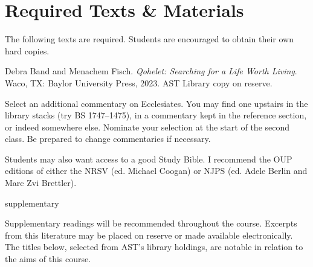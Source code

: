 \documentclass[titlepage]{article}
\newcommand\incl{../includes}
\begin{document}


%

\section{Required Texts \& Materials}
\label{texts}

The following texts are required. Students are encouraged to obtain their own hard copies.

\begingroup
\renewcommand{\section}[2]{}%
\begin{thebibliography}{BS 1747–75}%

	 Debra Band and Menachem Fisch.
    \emph{Qohelet: Searching for a Life Worth Living}.
    Waco, TX: Baylor University Press, 2023. AST Library copy on reserve.

	 Select an additional commentary on Ecclesiates.
	You may find one upstairs in the library stacks (try BS 1747–1475),
	in a commentary kept in the reference section, or indeed somewhere
	else. Nominate your selection at the start of the second class. Be
	prepared to change commentaries if necessary.

\end{thebibliography}
\endgroup

Students may also want access to a good Study Bible. I recommend the OUP
editions of either the NRSV (ed. Michael Coogan) or NJPS (ed. Adele
Berlin and Marc Zvi Brettler).

\section{Supplementary Texts}
\label{supplementary}

Supplementary readings will be recommended throughout the course.
Excerpts from this literature may be placed on reserve or made available
electronically. The titles below, selected from AST’s library holdings,
are notable in relation to the aims of this course.
\end{document}
